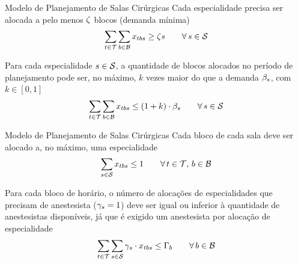 \documentclass[10pt]{beamer}
\begin{document}
\begin{frame}{Modelo de Planejamento de Salas Cirúrgicas}
    Cada especialidade precisa ser alocada a pelo menos $\zeta$ blocos (demanda mínima)
    \begin{equation}
    \label{eq:m2-2}
        \sum_{t \in \mathcal{T}} \sum_{b \in \mathcal{B}} x_{tbs} \geq \zeta{s} \hspace{2em} \forall\, s \in \mathcal{S}
    \end{equation}
    
    Para cada especialidade $s \in \mathcal{S}$, a quantidade de blocos alocados no período de planejamento pode ser, no máximo, $k$ vezes maior do que a demanda $\beta_{s}$, com $k \in [0,1]$
    \begin{equation}
    \label{eq:m2-3}
        \sum_{t \in \mathcal{T}} \sum_{b \in \mathcal{B}} x_{tbs} \leq (1 + k) \cdot \beta_{s} \hspace{2em} \forall\, s \in \mathcal{S}
    \end{equation}
\end{frame}


\begin{frame}{Modelo de Planejamento de Salas Cirúrgicas}    
    Cada bloco de cada sala deve ser alocado a, no máximo, uma especialidade
    \begin{equation}
    \label{eq:m2-4}
        \sum_{s \in \mathcal{S}} x_{tbs} \leq 1 \hspace{2em} \forall\, t \in \mathcal{T},\, b \in \mathcal{B}
    \end{equation}
    
    Para cada bloco de horário, o número de alocações de especialidades que precisam de anestesista ($\gamma_s = 1$) deve ser igual ou inferior à quantidade de anestesistas disponíveis, já que é exigido um anestesista por alocação de especialidade
    \begin{equation}
    \label{eq:m2-5}
        \sum_{t \in \mathcal{T}} \sum_{s \in \mathcal{S}} \gamma_{s} \cdot x_{tbs} \leq \Gamma_{b} \hspace{2em} \forall\, b \in \mathcal{B}
    \end{equation}
\end{frame}
\end{document}
